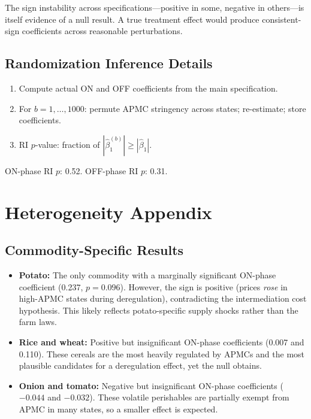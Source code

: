 \documentclass[12pt]{article}
\begin{document}
The sign instability across specifications---positive in some, negative in others---is itself evidence of a null result. A true treatment effect would produce consistent-sign coefficients across reasonable perturbations.

\subsection{Randomization Inference Details}

\begin{enumerate}
    \item Compute actual ON and OFF coefficients from the main specification.
    \item For $b = 1, \ldots, 1000$: permute APMC stringency across states; re-estimate; store coefficients.
    \item RI $p$-value: fraction of $|\hat{\beta}_1^{(b)}| \geq |\hat{\beta}_1|$.
\end{enumerate}

ON-phase RI $p$: 0.52. OFF-phase RI $p$: 0.31.


\section{Heterogeneity Appendix}
\label{app:heterogeneity}

\subsection{Commodity-Specific Results}

\begin{itemize}
    \item \textbf{Potato:} The only commodity with a marginally significant ON-phase coefficient (0.237, $p = 0.096$). However, the sign is positive (prices \emph{rose} in high-APMC states during deregulation), contradicting the intermediation cost hypothesis. This likely reflects potato-specific supply shocks rather than the farm laws.

    \item \textbf{Rice and wheat:} Positive but insignificant ON-phase coefficients (0.007 and 0.110). These cereals are the most heavily regulated by APMCs and the most plausible candidates for a deregulation effect, yet the null obtains.

    \item \textbf{Onion and tomato:} Negative but insignificant ON-phase coefficients ($-0.044$ and $-0.032$). These volatile perishables are partially exempt from APMC in many states, so a smaller effect is expected.
\end{itemize}
\end{document}
